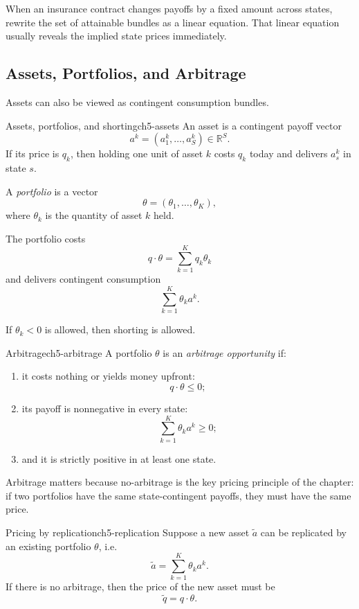 \begin{examtip}
When an insurance contract changes payoffs by a fixed amount across states, rewrite the set of attainable bundles as a linear equation. That linear equation usually reveals the implied state prices immediately.
\end{examtip}

\subsection{Assets, Portfolios, and Arbitrage}

Assets can also be viewed as contingent consumption bundles.

\begin{definition}{Assets, portfolios, and shorting}{ch5-assets}
An asset is a contingent payoff vector
\[
a^k=(a_1^k,\dots,a_S^k)\in \mathbb{R}^S.
\]
If its price is $q_k$, then holding one unit of asset $k$ costs $q_k$ today and delivers $a_s^k$ in state $s$.

A \emph{portfolio} is a vector
\[
\theta=(\theta_1,\dots,\theta_K),
\]
where $\theta_k$ is the quantity of asset $k$ held.

The portfolio costs
\[
q\cdot \theta = \sum_{k=1}^K q_k \theta_k
\]
and delivers contingent consumption
\[
\sum_{k=1}^K \theta_k a^k.
\]

If $\theta_k<0$ is allowed, then shorting is allowed.
\end{definition}

\begin{definition}{Arbitrage}{ch5-arbitrage}
A portfolio $\theta$ is an \emph{arbitrage opportunity} if:
\begin{enumerate}
    \item it costs nothing or yields money upfront:
    \[
    q\cdot \theta \le 0;
    \]
    \item its payoff is nonnegative in every state:
    \[
    \sum_{k=1}^K \theta_k a^k \ge 0;
    \]
    \item and it is strictly positive in at least one state.
\end{enumerate}
\end{definition}

Arbitrage matters because no-arbitrage is the key pricing principle of the chapter: if two portfolios have the same state-contingent payoffs, they must have the same price.

\begin{theorem}{Pricing by replication}{ch5-replication}
Suppose a new asset $\tilde a$ can be replicated by an existing portfolio $\theta$, i.e.
\[
\tilde a = \sum_{k=1}^K \theta_k a^k.
\]
If there is no arbitrage, then the price of the new asset must be
\[
\tilde q = q\cdot \theta.
\]
\end{theorem}

